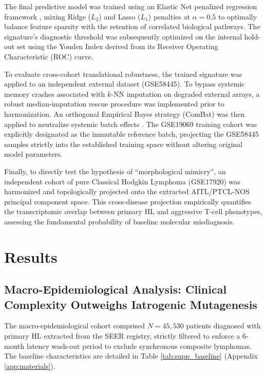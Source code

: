 \documentclass[a4paper,11pt,twocolumn]{article}
\begin{document}
	The final predictive model was trained using an Elastic Net penalized regression framework \cite{Zou2005}, mixing Ridge ($L_2$) and Lasso ($L_1$) penalties at $\alpha = 0.5$ to optimally balance feature sparsity with the retention of correlated biological pathways. The signature's diagnostic threshold was subsequently optimized on the internal hold-out set using the Youden Index derived from its Receiver Operating Characteristic (ROC) curve.
	
	To evaluate cross-cohort translational robustness, the trained signature was applied to an independent external dataset (GSE58445). To bypass systemic memory crashes associated with $k$-NN imputation on degraded external arrays, a robust median-imputation rescue procedure was implemented prior to harmonization. An orthogonal Empirical Bayes strategy (ComBat) was then applied to neutralize systemic batch effects \cite{Johnson2007}. The GSE19069 training cohort was explicitly designated as the immutable reference batch, projecting the GSE58445 samples strictly into the established training space without altering original model parameters.
	
	Finally, to directly test the hypothesis of ``morphological mimicry'', an independent cohort of pure Classical Hodgkin Lymphoma (GSE17920) was harmonized and topologically projected onto the extracted AITL/PTCL-NOS principal component space. This cross-disease projection empirically quantifies the transcriptomic overlap between primary HL and aggressive T-cell phenotypes, assessing the fundamental probability of baseline molecular misdiagnosis.
	
	\section{Results}
	
	\subsection{Macro-Epidemiological Analysis: Clinical Complexity Outweighs Iatrogenic Mutagenesis}
	
	The macro-epidemiological cohort comprised $N=45,530$ patients diagnosed with primary HL extracted from the SEER registry, strictly filtered to enforce a 6-month latency wash-out period to exclude synchronous composite lymphomas. The baseline characteristics are detailed in Table \ref{tab:supp_baseline} (Appendix \ref{app:materials}).
	
\end{document}
